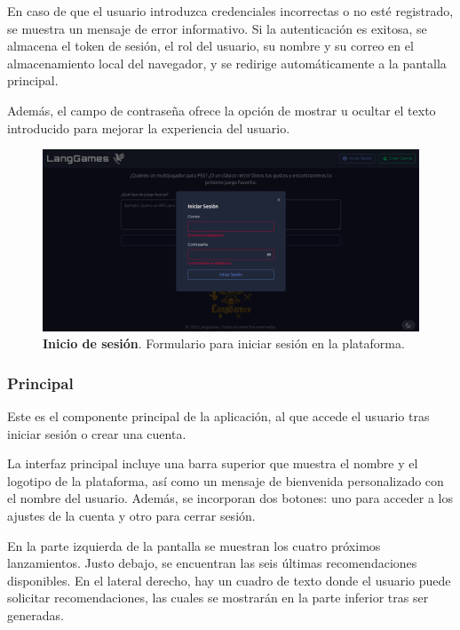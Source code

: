 En caso de que el usuario introduzca credenciales incorrectas o no esté registrado, se muestra un mensaje de error informativo. Si la autenticación es exitosa, se almacena el token de sesión, el rol del usuario, su nombre y su correo en el almacenamiento local del navegador, y se redirige automáticamente a la pantalla principal.

Además, el campo de contraseña ofrece la opción de mostrar u ocultar el texto introducido para mejorar la experiencia del usuario.

\begin{figure}[H]
	\centering
	\includegraphics[width=1\linewidth]{imagenes/login.png}
	\caption[\textbf{Inicio de sesión}.]{\textbf{Inicio de sesión}. Formulario para iniciar sesión en la plataforma.}
	\label{imagen-login}
\end{figure}



\subsubsection{Principal}

Este es el componente principal de la aplicación, al que accede el usuario tras iniciar sesión o crear una cuenta.

La interfaz principal incluye una barra superior que muestra el nombre y el logotipo de la plataforma, así como un mensaje de bienvenida personalizado con el nombre del usuario. Además, se incorporan dos botones: uno para acceder a los ajustes de la cuenta y otro para cerrar sesión.

En la parte izquierda de la pantalla se muestran los cuatro próximos lanzamientos. Justo debajo, se encuentran las seis últimas recomendaciones disponibles. En el lateral derecho, hay un cuadro de texto donde el usuario puede solicitar recomendaciones, las cuales se mostrarán en la parte inferior tras ser generadas.

